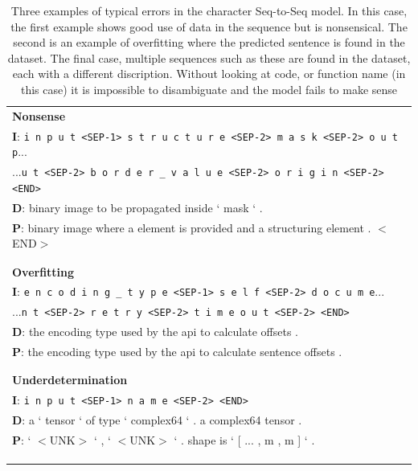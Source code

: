 \begin{table}
\begin{center}
\begin{tabular}{ l  }

\textbf{Nonsense}\\

\textbf{I}: \texttt{i n p u t <SEP-1> s t r u c t u r e <SEP-2> m a s k <SEP-2> o u t p}...\\
...\texttt{u t <SEP-2> b o r d e r _ v a l u e <SEP-2> o r i g i n <SEP-2> <END>}\\
\textbf{D}: binary image to be propagated inside ` mask ` .\\
\textbf{P}: binary image where a element is provided and a structuring element . $<$END$>$\\
\\\hline\\


\textbf{Overfitting}\\

\textbf{I}: \texttt{e n c o d i n g _ t y p e <SEP-1> s e l f <SEP-2> d o c u m e}...\\
...\texttt{n t <SEP-2> r e t r y <SEP-2> t i m e o u t <SEP-2> <END>}\\
\textbf{D}: the encoding type used by the api to calculate offsets .\\
\textbf{P}: the encoding type used by the api to calculate sentence offsets . \\
\\\hline\\




\textbf{Underdetermination}\\

\textbf{I}: \texttt{i n p u t <SEP-1> n a m e <SEP-2> <END>}\\
\textbf{D}: a ` tensor ` of type ` complex64 ` . a complex64 tensor .\\
\textbf{P}: ` $<$UNK$>$ ` , ` $<$UNK$>$ ` . shape is ` [ ... , m , m ] ` . \\
\\\hline\\

\\

\end{tabular}

\caption{Three examples of typical errors in the character Seq-to-Seq model.  In this case, the first example shows good use of data in the sequence but is nonsensical. The second is an example of overfitting where the predicted sentence is found in the dataset. The final case, multiple sequences such as these are found in the dataset, each with a different discription. Without looking at code, or function name (in this case) it is impossible to disambiguate and the model fails to make sense }
\end{center}
\end{table}

